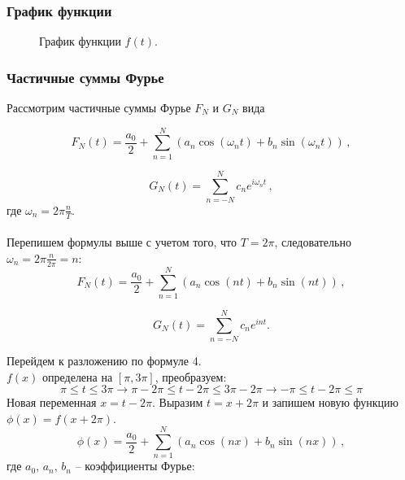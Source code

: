 \documentclass[a5paper, 10pt]{article}
\theoremstyle{definition}
\theoremstyle{plain}
\theoremstyle{remark}
\begin{document}
\subsubsection{График функции}
\begin{figure}[h]
\caption{График функции $f(t)$.}
\end{figure}

\subsubsection{Частичные суммы Фурье}
Рассмотрим частичные суммы Фурье $F_N$ и $G_N$ вида

\begin{equation}
F_N(t) = \frac{a_0}{2} + \sum  \limits_{n=1}^N \left( a_n \cos \left( \omega_n t \right) + b_n \sin \left( \omega_n t \right)  \right) \, ,
\end{equation}

\begin{equation}
G_N (t) = \sum  \limits_{n=-N}^N c_n e^{i \omega_n t} \, ,
\end{equation}
где $\omega_n = 2 \pi \frac{n}{T}$.\\
\\
Перепишем формулы выше с учетом того, что $T = 2 \pi$, следовательно  $\omega_n = 2 \pi \frac{n}{ 2 \pi} = n$:
\begin{equation}
F_N(t) = \frac{a_0}{2} + \sum  \limits_{n=1}^N \left( a_n \cos \left( n t \right) + b_n \sin \left( n t \right)  \right) \, ,
\end{equation}

\begin{equation}
G_N (t) = \sum  \limits_{n=-N}^N c_n e^{i n t}.
\end{equation}

Перейдем к разложению по формуле 4.\\
$f(x)$ определена на $[ \pi, 3\pi]$, преобразуем:
\begin{equation}
\pi \leq t \leq 3 \pi \to \pi - 2 \pi \leq t - 2 \pi \leq 3 \pi - 2 \pi \to -\pi \leq t - 2 \pi \leq \pi
\end{equation}
Новая переменная $x = t - 2\pi$. Выразим $t = x + 2 \pi$ и запишем новую функцию $\phi (x) = f (x + 2 \pi)$.
\begin{equation}
\phi (x) = \frac{a_0}{2} + \sum  \limits_{n=1}^N \left( a_n \cos \left( n x \right) + b_n \sin \left( n x \right)  \right) \, ,
\end{equation}
где $a_0, \, a_n, \, b_n$ -- коэффициенты Фурье:
\end{document}
